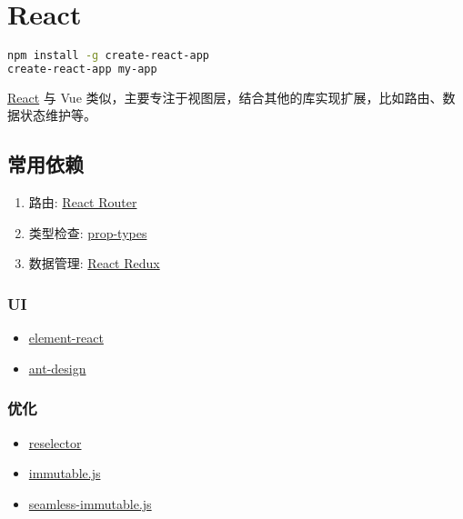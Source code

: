 \section{React}\label{react}

\begin{lstlisting}[language=bash]
npm install -g create-react-app
create-react-app my-app
\end{lstlisting}

\href{https://reactjs.org/}{React} 与 Vue
类似，主要专注于视图层，结合其他的库实现扩展，比如路由、数据状态维护等。

\subsection{常用依赖}\label{ux5e38ux7528ux4f9dux8d56}

\begin{enumerate}
\def\labelenumi{\arabic{enumi}.}
\tightlist
\item
  路由: \href{https://github.com/ReactTraining/react-router}{React
  Router}
\item
  类型检查: \href{https://github.com/facebook/prop-types}{prop-types}
\item
  数据管理: \href{https://github.com/reactjs/react-redux}{React Redux}
\end{enumerate}

\subsubsection{UI}\label{ui}

\begin{itemize}
\tightlist
\item
  \href{https://eleme.github.io/element-react/}{element-react}
\item
  \href{https://ant.design/}{ant-design}
\end{itemize}

\subsubsection{优化}\label{ux4f18ux5316}

\begin{itemize}
\tightlist
\item
  \href{https://github.com/reactjs/reselect}{reselector}
\item
  \href{https://github.com/facebook/immutable-js}{immutable.js}
\item
  \href{https://github.com/rtfeldman/seamless-immutable}{seamless-immutable.js}
\end{itemize}

